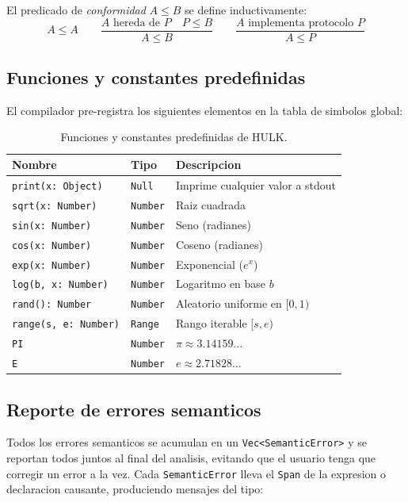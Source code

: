 \documentclass[12pt,a4paper]{article}
\begin{document}
El predicado de \textit{conformidad} $A \leq B$ se define inductivamente:
$$A \leq A \qquad \frac{A \text{ hereda de } P \quad P \leq B}{A \leq B}
\qquad \frac{A \text{ implementa protocolo } P}{A \leq P}$$

\subsection{Funciones y constantes predefinidas}

El compilador pre-registra los siguientes elementos en la tabla de simbolos global:

\begin{table}[H]
\centering
\begin{tabular}{lll}
\toprule
\textbf{Nombre} & \textbf{Tipo} & \textbf{Descripcion} \\
\midrule
\texttt{print(x: Object)} & \texttt{Null} & Imprime cualquier valor a stdout \\
\texttt{sqrt(x: Number)} & \texttt{Number} & Raiz cuadrada \\
\texttt{sin(x: Number)} & \texttt{Number} & Seno (radianes) \\
\texttt{cos(x: Number)} & \texttt{Number} & Coseno (radianes) \\
\texttt{exp(x: Number)} & \texttt{Number} & Exponencial ($e^x$) \\
\texttt{log(b, x: Number)} & \texttt{Number} & Logaritmo en base $b$ \\
\texttt{rand(): Number} & \texttt{Number} & Aleatorio uniforme en $[0,1)$ \\
\texttt{range(s, e: Number)} & \texttt{Range} & Rango iterable $[s, e)$ \\
\texttt{PI} & \texttt{Number} & $\pi \approx 3.14159\ldots$ \\
\texttt{E}  & \texttt{Number} & $e \approx 2.71828\ldots$ \\
\bottomrule
\end{tabular}
\caption{Funciones y constantes predefinidas de HULK.}
\end{table}

\subsection{Reporte de errores semanticos}

Todos los errores semanticos se acumulan en un \texttt{Vec<SemanticError>} y se
reportan todos juntos al final del analisis, evitando que el usuario tenga que
corregir un error a la vez. Cada \texttt{SemanticError} lleva el \texttt{Span} de la
expresion o declaracion causante, produciendo mensajes del tipo:
\end{document}
